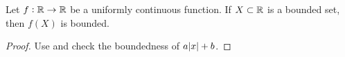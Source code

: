\begin{theorem}
    Let $f: \mathbb{R} \rightarrow \mathbb{R}$ be a uniformly continuous function. If $X \subset \mathbb{R}$ is a bounded set, then $f(X)$ is bounded.
\end{theorem}
\begin{proof}
    Use  and check the boundedness of $a\abs{x}+b$.
\end{proof}




































































































